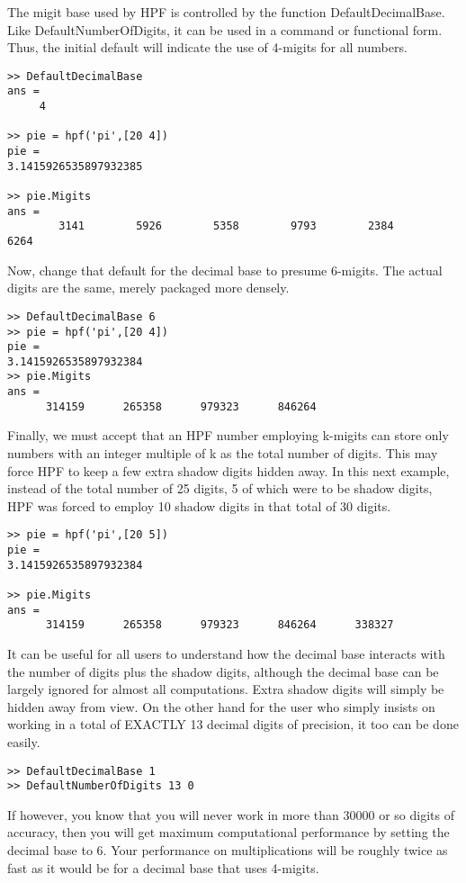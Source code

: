\documentclass[a4paper,12pt]{article}
\begin{document}
The migit base used by HPF is controlled by the function DefaultDecimalBase. Like DefaultNumberOfDigits, it can be used in a command or functional form. Thus, the initial default will indicate the use of 4-migits for all numbers.

\begin{lstlisting}
>> DefaultDecimalBase
ans =
     4

>> pie = hpf('pi',[20 4])
pie =
3.1415926535897932385

>> pie.Migits
ans =
        3141        5926        5358        9793        2384        6264
\end{lstlisting}

Now, change that default for the decimal base to presume 6-migits. The actual digits are the same, merely packaged more densely.

\begin{lstlisting}
>> DefaultDecimalBase 6
>> pie = hpf('pi',[20 4])
pie =
3.1415926535897932384
>> pie.Migits
ans =
      314159      265358      979323      846264
\end{lstlisting}

Finally, we must accept that an HPF number employing k-migits can store only numbers with an integer multiple of k as the total number of digits. This may force HPF to keep a few extra shadow digits hidden away. In this next example, instead of the total number of 25 digits, 5 of which were to be shadow digits, HPF was forced to employ 10 shadow digits in that total of 30 digits.

\begin{lstlisting}
>> pie = hpf('pi',[20 5])
pie =
3.1415926535897932384

>> pie.Migits
ans =
      314159      265358      979323      846264      338327
\end{lstlisting}

It can be useful for all users to understand how the decimal base interacts with the number of digits plus the shadow digits, although the decimal base can be largely ignored for almost all computations. Extra shadow digits will simply be hidden away from view. On the other hand for the user who simply insists on working in a total of EXACTLY 13 decimal digits of precision, it too can be done easily.

\begin{lstlisting}
>> DefaultDecimalBase 1
>> DefaultNumberOfDigits 13 0
\end{lstlisting}

If however, you know that you will never work in more than 30000 or so digits of accuracy, then you will get maximum computational performance by setting the decimal base to 6. Your performance on multiplications will be roughly twice as fast as it would be for a decimal base that uses 4-migits.
\end{document}
